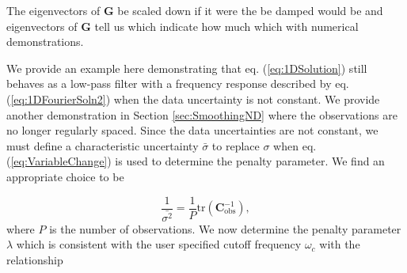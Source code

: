 \documentclass[10pt,a4paper]{article}
\begin{document}
The eigenvectors of $\mathbf{G}$ be scaled down if it were the be damped would be and eigenvectors of $\mathbf{G}$ tell us which  indicate how much which   with numerical demonstrations. 

We provide an example here demonstrating that eq. (\ref{eq:1DSolution}) still behaves as a low-pass filter with a frequency response described by eq. (\ref{eq:1DFourierSoln2}) when the data uncertainty is not constant.  We provide another demonstration in Section \ref{sec:SmoothingND} where the observations are no longer regularly spaced. Since the data uncertainties are not constant, we must define a characteristic uncertainty $\bar{\sigma}$ to replace $\sigma$ when eq. (\ref{eq:VariableChange}) is used to determine the penalty parameter.  We find an appropriate choice to be 

\begin{equation}
\frac{1}{\bar{\sigma^2}} = \frac{1}{P} \mathrm{tr}\left(\mathbf{C}_\mathrm{obs}^{-1}\right),
\end{equation}
where $P$ is the number of observations.  We now determine the penalty parameter $\lambda$ which is consistent with the user specified cutoff frequency $\omega_c$ with the relationship
\end{document}
